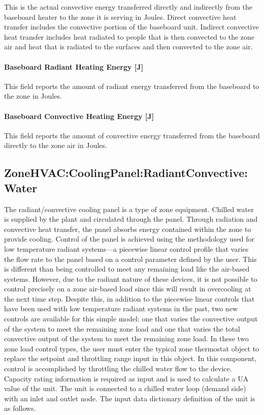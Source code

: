 This is the actual convective energy transferred directly and indirectly from the baseboard heater to the zone it is serving in Joules. Direct convective heat transfer includes the convective portion of the baseboard unit. Indirect convective heat transfer includes heat radiated to people that is then convected to the zone air and heat that is radiated to the surfaces and then convected to the zone air.

\paragraph{Baseboard Radiant Heating Energy {[}J{]}}\label{baseboard-radiant-heating-energy-j-2}

This field reports the amount of radiant energy transferred from the baseboard to the zone in Joules.

\paragraph{Baseboard Convective Heating Energy {[}J{]}}\label{baseboard-convective-heating-energy-j-2}

This field reports the amount of convective energy transferred from the baseboard directly to the zone air in Joules.

\subsection{ZoneHVAC:CoolingPanel:RadiantConvective:Water}\label{zonehvaccoolingpanelradiantconvectivewater}

The radiant/convective cooling panel is a type of zone equipment.  Chilled water is supplied by the plant and circulated through the panel.  Through radiation and convective heat transfer, the panel absorbs energy contained within the zone to provide cooling.  Control of the panel is achieved using the methodology used for low temperature radiant systems—a piecewise linear control profile that varies the flow rate to the panel based on a control parameter defined by the user.  This is different than being controlled to meet any remaining load like the air-based systems.  However, due to the radiant nature of these devices, it is not possible to control precisely on a zone air-based load since this will result in overcooling at the next time step.  Despite this, in addition to the piecewise linear controls that have been used with low temperature radiant systems in the past, two new controls are available for this simple model: one that varies the convective output of the system to meet the remaining zone load and one that varies the total convective output of the system to meet the remaining zone load.  In these two zone load control types, the user must enter the typical zone thermostat object to replace the setpoint and throttling range input in this object.  In this component, control is accomplished by throttling the chilled water flow to the device.  Capacity rating information is required as input and is used to calculate a UA value of the unit. The unit is connected to a chilled water loop (demand side) with an inlet and outlet node. The input data dictionary definition of the unit is as follows.

